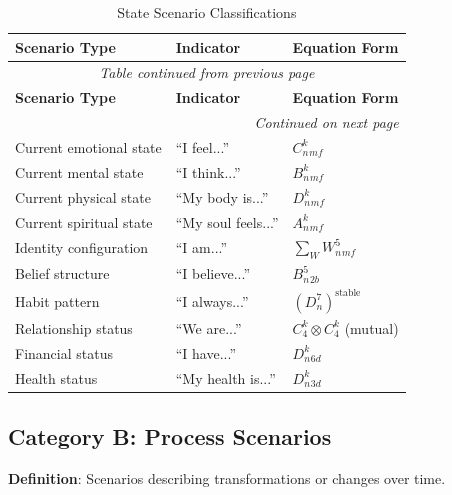 \documentclass[11pt,twoside]{book}
\renewcommand{\arraystretch}{1.2}  %
\begin{document}
\begin{center}
\small
\renewcommand{\arraystretch}{1.3}
\begin{longtable}{p{2.5cm}|p{3cm}|p{4cm}}
\caption{State Scenario Classifications} \\
\toprule
\textbf{Scenario Type} & \textbf{Indicator} & \textbf{Equation Form} \\
\midrule
\endfirsthead
\multicolumn{3}{c}{\textit{Table continued from previous page}} \\
\toprule
\textbf{Scenario Type} & \textbf{Indicator} & \textbf{Equation Form} \\
\midrule
\endhead
\midrule
\multicolumn{3}{r}{\textit{Continued on next page}} \\
\endfoot
\bottomrule
\endlastfoot
Current emotional state & ``I feel...'' & $C_n^k_{mf}$ \\
Current mental state & ``I think...'' & $B_n^k_{mf}$ \\
Current physical state & ``My body is...'' & $D_n^k_{mf}$ \\
Current spiritual state & ``My soul feels...'' & $A_n^k_{mf}$ \\
Identity configuration & ``I am...'' & $\sum_W W_n^5_{mf}$ \\
Belief structure & ``I believe...'' & $B_n^5_{2b}$ \\
Habit pattern & ``I always...'' & $(D_n^7)^{\mathrm{stable}}$ \\
Relationship status & ``We are...'' & $C_4^k \otimes C_4^k$ (mutual) \\
Financial status & ``I have...'' & $D_n^k_{6d}$ \\
Health status & ``My health is...'' & $D_n^k_{3d}$ \\
\end{longtable}
\end{center}

\subsection{Category B: Process Scenarios}

\textbf{Definition}: Scenarios describing transformations or changes over time.
\end{document}
